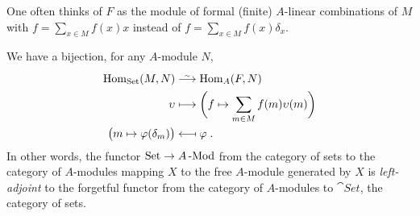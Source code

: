 \documentclass[a4paper,parskip=half,numbers=enddot, DIV=12]{scrreprt}
\begin{document}
\begin{rem*}
    \begin{alphanumerate}
        \item  
            One often thinks of $F$ as the module of formal (finite) $A$-linear combinations of $M$ with $f=\sum_{x\in M} f(x) x$ instead of $f= \sum_{x\in M} f(x)\delta_x$.
        \item 
            We have a bijection, for any $A$-module $N$,
            \begin{align*}
                \Hom_{\cat{Set}}(M,N) &\isomorphism \Hom_A(F,N)\\
                \upsilon &\longmapsto \bigg(f\mapsto \sum_{m\in M} f(m) \upsilon(m)\bigg)\\
                \big(m\mapsto \phi(\delta_m) \big) &\longmapsfrom \phi\;.
            \end{align*}
            In other words, the functor $\cat{Set}\morphism A\cat{-Mod}$ from the category of sets to the category of $A$-modules mapping $X$ to the free $A$-module generated by $X$ is \emph{left-adjoint} to the forgetful functor from the category of $A$-modules to $\cat{Set}$, the category of sets.
    \end{alphanumerate}
\end{rem*}
\end{document}
